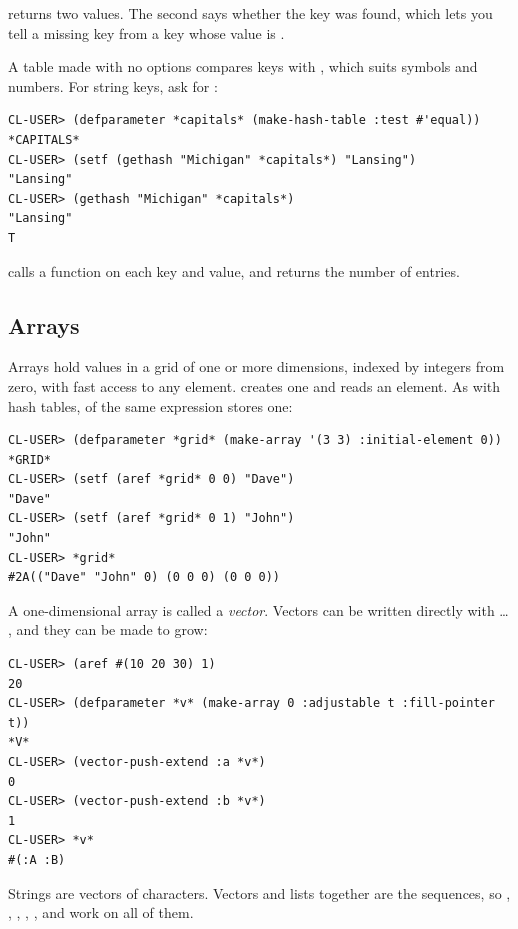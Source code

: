  returns two values. The second says whether the key
was found, which lets you tell a missing key from a key whose value is
.

A table made with no options compares keys with , which
suits symbols and numbers. For string keys, ask for :

\begin{verbatim}
CL-USER> (defparameter *capitals* (make-hash-table :test #'equal))
*CAPITALS*
CL-USER> (setf (gethash "Michigan" *capitals*) "Lansing")
"Lansing"
CL-USER> (gethash "Michigan" *capitals*)
"Lansing"
T
\end{verbatim}

 calls a function on each key and value, and
 returns the number of entries.

\subsection{Arrays}
\label{sec:arrays}

Arrays hold values in a grid of one or more dimensions, indexed by
integers from zero, with fast access to any element.
 creates one and  reads an element. As
with hash tables,  of the same expression stores one:

\begin{verbatim}
CL-USER> (defparameter *grid* (make-array '(3 3) :initial-element 0))
*GRID*
CL-USER> (setf (aref *grid* 0 0) "Dave")
"Dave"
CL-USER> (setf (aref *grid* 0 1) "John")
"John"
CL-USER> *grid*
#2A(("Dave" "John" 0) (0 0 0) (0 0 0))
\end{verbatim}

A one-dimensional array is called a \emph{vector}. Vectors can be
written directly with \code{\#(} \ldots{} \code{)}, and they can be made
to grow:

\begin{verbatim}
CL-USER> (aref #(10 20 30) 1)
20
CL-USER> (defparameter *v* (make-array 0 :adjustable t :fill-pointer t))
*V*
CL-USER> (vector-push-extend :a *v*)
0
CL-USER> (vector-push-extend :b *v*)
1
CL-USER> *v*
#(:A :B)
\end{verbatim}

Strings are vectors of characters. Vectors and lists together are the
sequences, so , , ,
, ,  and  work on
all of them.


